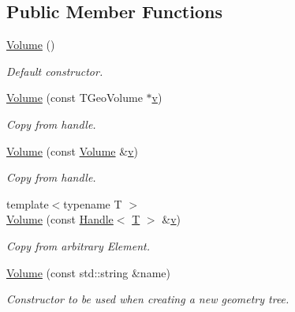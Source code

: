 \subsection*{Public Member Functions}
\begin{DoxyCompactItemize}
\item 
\hyperlink{class_d_d4hep_1_1_geometry_1_1_volume_a5e8cfa8694162b1e3be9401e64667370}{Volume} ()
\begin{DoxyCompactList}\small\item\em Default constructor. \item\end{DoxyCompactList}\item 
\hyperlink{class_d_d4hep_1_1_geometry_1_1_volume_ac5e2f7fc0aeafa1ca916e01e8a159c29}{Volume} (const TGeoVolume $\ast$\hyperlink{_multi_view_8cpp_a8320ee13ac034dbf6d624fe8953dd337}{v})
\begin{DoxyCompactList}\small\item\em Copy from handle. \item\end{DoxyCompactList}\item 
\hyperlink{class_d_d4hep_1_1_geometry_1_1_volume_ac9854eb2a3029d348c04643e44abbea4}{Volume} (const \hyperlink{class_d_d4hep_1_1_geometry_1_1_volume}{Volume} \&\hyperlink{_multi_view_8cpp_a8320ee13ac034dbf6d624fe8953dd337}{v})
\begin{DoxyCompactList}\small\item\em Copy from handle. \item\end{DoxyCompactList}\item 
{\footnotesize template$<$typename T $>$ }\\\hyperlink{class_d_d4hep_1_1_geometry_1_1_volume_a94b33c96ae6d3156333dcbc025808201}{Volume} (const \hyperlink{class_d_d4hep_1_1_handle}{Handle}$<$ \hyperlink{class_t}{T} $>$ \&\hyperlink{_multi_view_8cpp_a8320ee13ac034dbf6d624fe8953dd337}{v})
\begin{DoxyCompactList}\small\item\em Copy from arbitrary Element. \item\end{DoxyCompactList}\item 
\hyperlink{class_d_d4hep_1_1_geometry_1_1_volume_adf459bc7a5cc8226ea4ca7d35c6f4eba}{Volume} (const std::string \&name)
\begin{DoxyCompactList}\small\item\em Constructor to be used when creating a new geometry tree. \item\end{DoxyCompactList}\item 

\end{DoxyCompactItemize}
